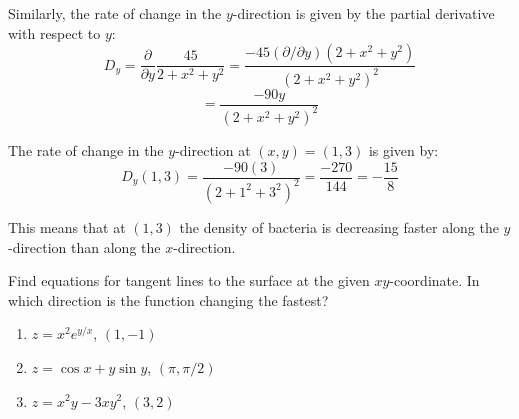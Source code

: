Similarly, the rate of change in the $y$-direction is given by the partial 
derivative with respect to $y$:
$$D_y = \frac{\partial}{\partial y} \frac{45}{2 + x^2 + y^2} = \frac{-45 \left(
\partial/\partial y \right) \left(2 + x^2 + y^2 \right)}{\left( 2 + x^2 + y^2 
\right)^2}$$
$$= \frac{-90y}{\left(2 + x^2 + y^2 \right)^2}$$

The rate of change in the $y$-direction at $(x, y) = (1, 3)$ is given by:
$$D_y(1, 3) = \frac{-90(3)}{\left(2 + 1^2 + 3^2 \right)^2} = \frac{-270}{144} 
= -\frac{15}{8}$$

This means that at $(1, 3)$ the density of bacteria is decreasing faster along 
the $y$-direction than along the $x$-direction. 

\begin{Exercise}[title = {Using partial derivatives to find tangent lines}, 
label = tangent]
Find equations for tangent lines to the surface at the given $xy$-coordinate. 
In which direction is the function changing the fastest?
\begin{enumerate}
\item $z = x^2e^{y/x}$, $(1, -1)$
\item $z = \cos{x} + y\sin{y}$, $(\pi, \pi/2)$
\item $z = x^2y - 3xy^2$, $(3, 2)$
\end{enumerate}
\vspace{75mm}
\end{Exercise}

